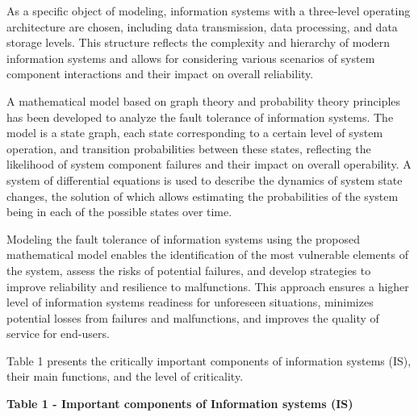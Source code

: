 As a specific object of modeling, information systems with a three-level
operating architecture are chosen, including data transmission, data
processing, and data storage levels. This structure reflects the
complexity and hierarchy of modern information systems and allows for
considering various scenarios of system component interactions and their
impact on overall reliability.

A mathematical model based on graph theory and probability theory
principles has been developed to analyze the fault tolerance of
information systems. The model is a state graph, each state
corresponding to a certain level of system operation, and transition
probabilities between these states, reflecting the likelihood of system
component failures and their impact on overall operability. A system of
differential equations is used to describe the dynamics of system state
changes, the solution of which allows estimating the probabilities of
the system being in each of the possible states over time.

Modeling the fault tolerance of information systems using the proposed
mathematical model enables the identification of the most vulnerable
elements of the system, assess the risks of potential failures, and
develop strategies to improve reliability and resilience to
malfunctions. This approach ensures a higher level of information
systems\textquotesingle{} readiness for unforeseen situations, minimizes
potential losses from failures and malfunctions, and improves the
quality of service for end-users.

Table 1 presents the critically important components of information
systems (IS), their main functions, and the level of criticality.

\textbf{Table 1 - Important components of Information systems (IS)}

